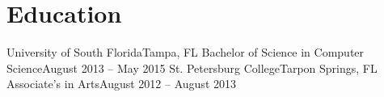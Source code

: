\section{Education}
  \resumeSubHeadingListStart
    \resumeSubheading
      {University of South Florida}{Tampa, FL}
      {Bachelor of Science in Computer Science}{August 2013 -- May 2015}
    \resumeSubheading
      {St. Petersburg College}{Tarpon Springs, FL}
      {Associate's in Arts}{August 2012 -- August 2013}
  \resumeSubHeadingListEnd

